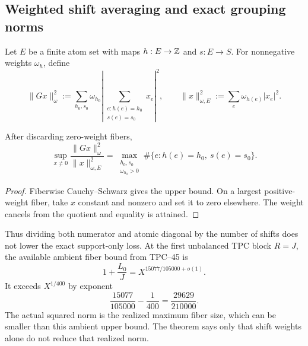 \subsection{Weighted shift averaging and exact grouping norms}

Let \(E\) be a finite atom set with maps
\(
 h:E\to\mathbb Z
\)
and
\(
 s:E\to S
\).
For nonnegative weights \(\omega_h\), define
\begin{equation}
 \|Gx\|_\omega^2
 :=\sum_{h_0,s_0}\omega_{h_0}
 \left|\sum_{\substack{e:h(e)=h_0\\s(e)=s_0}}x_e\right|^2,
 \qquad
 \|x\|_{\omega,E}^2
 :=\sum_e\omega_{h(e)}|x_e|^2.
 \label{eq:tpc46-weighted-grouping}
\end{equation}

\begin{theorem}
\label{thm:tpc46-weighted-grouping-norm}
After discarding zero-weight fibers,
\begin{equation}
 \boxed{
 \sup_{x\ne0}\frac{\|Gx\|_\omega^2}{\|x\|_{\omega,E}^2}
 =\max_{\substack{h_0,s_0\\\omega_{h_0}>0}}
 \#\{e:h(e)=h_0,\ s(e)=s_0\}.}
 \label{eq:tpc46-weighted-grouping-norm}
\end{equation}
\end{theorem}

\begin{proof}
Fiberwise Cauchy--Schwarz gives the upper bound.  On a largest
positive-weight fiber, take \(x\) constant and nonzero and set it to
zero elsewhere.  The weight cancels from the quotient and equality is
attained.
\end{proof}

Thus dividing both numerator and atomic diagonal by the number of
shifts does not lower the exact support-only loss.  At the first
unbalanced TPC block \(R=J\), the available ambient fiber bound from
TPC--45 is
\begin{equation}
 1+\frac{L_0}{J}
 =X^{15077/105000+o(1)}.
 \label{eq:tpc46-unbalanced-ambient-frontier}
\end{equation}
It exceeds \(X^{1/400}\) by exponent
\begin{equation}
 \frac{15077}{105000}-\frac1{400}
 =\frac{29629}{210000}.
 \label{eq:tpc46-unbalanced-budget-deficit}
\end{equation}
The actual squared norm is the realized maximum fiber size, which can
be smaller than this ambient upper bound.  The theorem says only that
shift weights alone do not reduce that realized norm.
